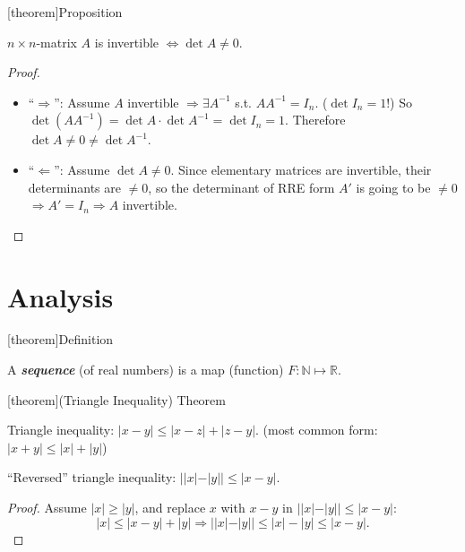 \documentclass[12pt]{report}
\theoremstyle{definition}
\begin{document}
[theorem]{Proposition}
\begin{invertible matrix is not 0}
    $n\times n$-matrix $A$ is invertible $\iff \det{A} \neq 0$.
\end{invertible matrix is not 0}

\begin{proof}
    \,

    \begin{itemize}
            \item ``$\Rightarrow{}$'': Assume $A$ invertible
                $\Rightarrow{} \exists A^{-1}$ s.t. $AA^{-1} = I_n$.
                ($\det{I_n} = 1$!) So
                $\det{(AA^{-1})} = \det{A}\cdot\det{A^{-1}} = \det{I_n} = 1$.
                Therefore $\det{A} \neq 0 \neq \det{A^{-1}}$.

            \item ``$\Leftarrow$'': Assume $\det{A} \neq 0$.
                Since elementary matrices are invertible, their determinants are $\neq 0$,
                so the determinant of RRE form $A'$ is going to be $\neq 0$
                $\Rightarrow{}A' = I_n \Rightarrow{}A$ invertible.
    \end{itemize}
    
\end{proof}






\chapter{Analysis}

[theorem]{Definition}
\begin{sequence}
    A \textbf{\emph{sequence}} (of real numbers) is a map (function) $F: \mathbb{N} \mapsto \mathbb{R}$.
\end{sequence}

[theorem]{(Triangle Inequality) Theorem}
\begin{triangle inequality}
    Triangle inequality: $|x-y| \le |x-z| + |z-y|$. (most common form: $|x+y| \le |x| + |y|$)

    ``Reversed'' triangle inequality: $||x|-|y|| \le |x-y|$.
\end{triangle inequality}

\begin{proof}
    Assume $|x| \ge |y|$, and replace $x$ with $x - y$ in $||x|-|y|| \le |x-y|$:\[
        |x| \le |x-y|+|y| \Rightarrow{}||x|-|y|| \le |x|-|y| \le |x-y|.
    \]
\end{proof}
\end{document}
